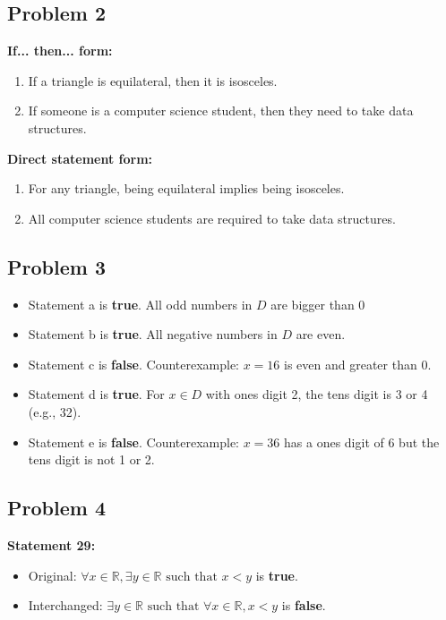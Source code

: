 \documentclass[a4paper, 10pt]{article}
\begin{document}
    \subsection{Problem 2}
    \textbf{If... then... form:}
    \begin{enumerate}
        \item If a triangle is equilateral, then it is isosceles.
        \item If someone is a computer science student, then they need to take data structures.
    \end{enumerate}

    \noindent \textbf{Direct statement form:}
    \begin{enumerate}
        \item For any triangle, being equilateral implies being isosceles.
        \item All computer science students are required to take data structures.
    \end{enumerate}

    \subsection{Problem 3}
    \begin{itemize}
        \item Statement a is \textbf{true}. All odd numbers in \( D \) are bigger than 0
        \item Statement b is \textbf{true}. All negative numbers in \( D \) are even.
        \item Statement c is \textbf{false}. Counterexample: \( x = 16 \) is even and greater than 0.
        \item Statement d is \textbf{true}. For \( x \in D \) with ones digit 2, the tens digit is 3 or 4 (e.g., 32).
        \item Statement e is \textbf{false}. Counterexample: \( x = 36 \) has a ones digit of 6 but the tens digit is not 1 or 2.
    \end{itemize}

    \subsection{Problem 4}
    \textbf{Statement 29:}
    \begin{itemize}
        \item Original: \( \forall x \in \mathbb{R}, \exists y \in \mathbb{R} \text{ such that } x < y \) is \textbf{true}.
        \item Interchanged: \( \exists y \in \mathbb{R} \text{ such that } \forall x \in \mathbb{R}, x < y \) is \textbf{false}.
    \end{itemize}
\end{document}
